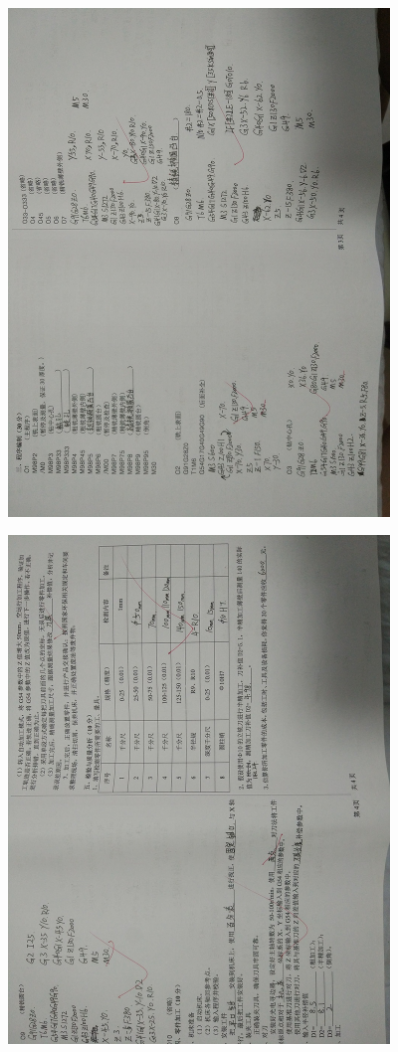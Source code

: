 \documentclass[a4paper,12pt]{article}
\numberwithin{table}{section}
\numberwithin{figure}{section}
\begin{document}
\begin{figure}[!h]
	\centering	
	\includegraphics[width=0.9\textwidth,angle=0]{images/fenshu7}
\end{figure}
\begin{figure}[!h]
	\centering	
	\includegraphics[width=0.9\textwidth,angle=0]{images/fenshu8}
\end{figure}
\end{document}

